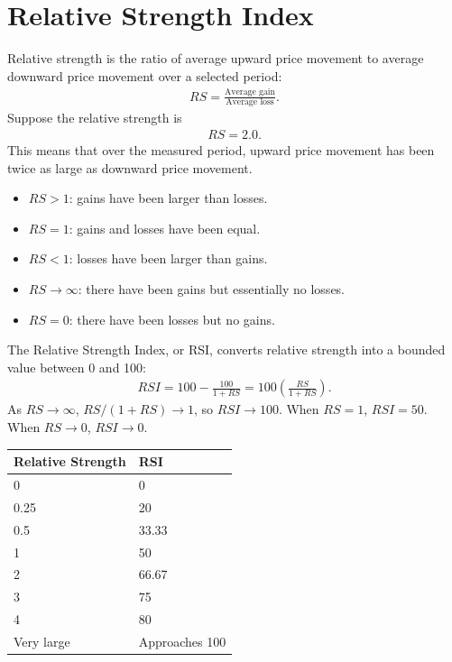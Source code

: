 \documentclass[letterpaper, 11pt]{article}
\newcommand{\1}{\mathds{1}}		%
\theoremstyle{definition}
\begin{document}
    \tableofcontents
    \pagebreak 
    \section{Relative Strength Index}
    \bigbreak \noindent 
    Relative strength is the ratio of average upward price movement to average downward price movement over a selected period:
    \begin{align*}
        RS = \frac{\text{Average gain}}{\text{Average loss}}
    .\end{align*}
    Suppose the relative strength is 
    \begin{align*}
        RS = 2.0
    .\end{align*}
    This means that over the measured period, upward price movement has been twice as large as downward price movement.
    \begin{itemize}
        \item $RS>1$: gains have been larger than losses.
        \item $RS=1$: gains and losses have been equal.
        \item $RS<1$: losses have been larger than gains.
        \item $RS\to\infty$: there have been gains but essentially no losses.
        \item $RS=0$: there have been losses but no gains.
    \end{itemize}
    The Relative Strength Index, or RSI, converts relative strength into a bounded value between 0 and 100:
    \begin{align*}
        RSI = 100 - \frac{100}{1+RS} = 100\left(\frac{RS}{1+RS}\right)
    .\end{align*}
    As $RS \to \infty$, $RS / (1+RS) \to 1$, so $RSI \to 100$. When $RS = 1$, $RSI  = 50$. When $RS \to 0$, $RSI \to 0$.
    \begin{center}
        \begin{tabularx}{\textwidth}{@{}ll@{}}
            \toprule
            \textbf{Relative Strength}&	\textbf{RSI} \\
            \midrule
            0	&0\\[2ex]
            0.25	&20\\[2ex]
            0.5	&33.33\\[2ex]
            1	&50\\[2ex]
            2	&66.67\\[2ex]
            3	&75\\[2ex]
            4	&80\\[2ex]
            Very large	&Approaches 100 \\
            \bottomrule
        \end{tabularx}
    \end{center}
\end{document}
